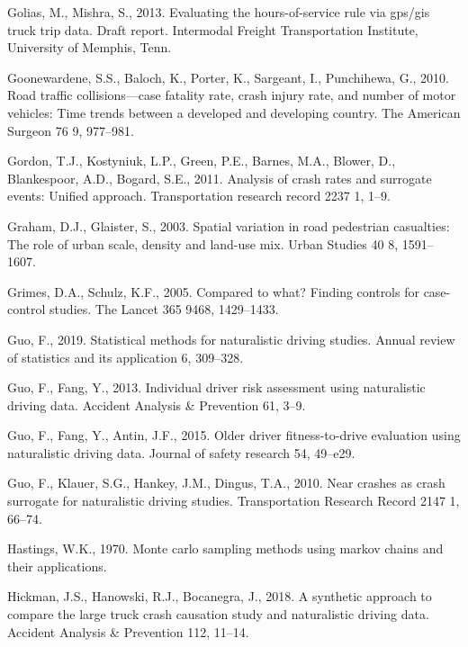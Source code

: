 \documentclass[12pt]{book}
\numberwithin{equation}{chapter}
\begin{document}
\leavevmode\hypertarget{ref-golias2013evaluating}{}%
Golias, M., Mishra, S., 2013. Evaluating the hours-of-service rule via gps/gis truck trip data. Draft report. Intermodal Freight Transportation Institute, University of Memphis, Tenn.

\leavevmode\hypertarget{ref-goonewardene2010road}{}%
Goonewardene, S.S., Baloch, K., Porter, K., Sargeant, I., Punchihewa, G., 2010. Road traffic collisions---case fatality rate, crash injury rate, and number of motor vehicles: Time trends between a developed and developing country. The American Surgeon 76 9, 977--981.

\leavevmode\hypertarget{ref-gordon2011analysis}{}%
Gordon, T.J., Kostyniuk, L.P., Green, P.E., Barnes, M.A., Blower, D., Blankespoor, A.D., Bogard, S.E., 2011. Analysis of crash rates and surrogate events: Unified approach. Transportation research record 2237 1, 1--9.

\leavevmode\hypertarget{ref-graham2003spatial}{}%
Graham, D.J., Glaister, S., 2003. Spatial variation in road pedestrian casualties: The role of urban scale, density and land-use mix. Urban Studies 40 8, 1591--1607.

\leavevmode\hypertarget{ref-grimes2005compared}{}%
Grimes, D.A., Schulz, K.F., 2005. Compared to what? Finding controls for case-control studies. The Lancet 365 9468, 1429--1433.

\leavevmode\hypertarget{ref-guo2019statistical}{}%
Guo, F., 2019. Statistical methods for naturalistic driving studies. Annual review of statistics and its application 6, 309--328.

\leavevmode\hypertarget{ref-guo2013individual}{}%
Guo, F., Fang, Y., 2013. Individual driver risk assessment using naturalistic driving data. Accident Analysis \& Prevention 61, 3--9.

\leavevmode\hypertarget{ref-guo2015older}{}%
Guo, F., Fang, Y., Antin, J.F., 2015. Older driver fitness-to-drive evaluation using naturalistic driving data. Journal of safety research 54, 49--e29.

\leavevmode\hypertarget{ref-guo2010near}{}%
Guo, F., Klauer, S.G., Hankey, J.M., Dingus, T.A., 2010. Near crashes as crash surrogate for naturalistic driving studies. Transportation Research Record 2147 1, 66--74.

\leavevmode\hypertarget{ref-hastings1970monte}{}%
Hastings, W.K., 1970. Monte carlo sampling methods using markov chains and their applications.

\leavevmode\hypertarget{ref-hickman2018synthetic}{}%
Hickman, J.S., Hanowski, R.J., Bocanegra, J., 2018. A synthetic approach to compare the large truck crash causation study and naturalistic driving data. Accident Analysis \& Prevention 112, 11--14.
\end{document}
